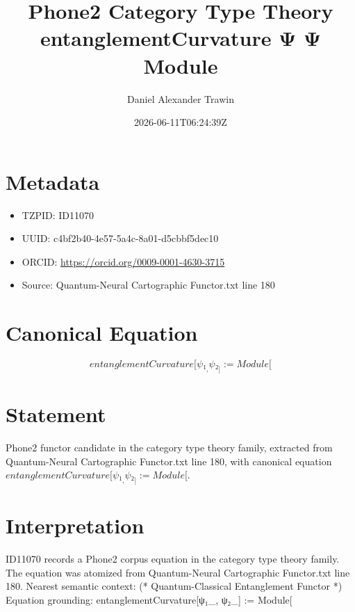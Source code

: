 \documentclass[11pt]{article}
\title{Phone2 Category Type Theory entanglementCurvature Ψ Ψ Module}
\author{Daniel Alexander Trawin}
\date{2026-06-11T06:24:39Z}
\begin{document}
\maketitle
\section*{Metadata}
\begin{itemize}
\item TZPID: ID11070
\item UUID: c4bf2b40-4e57-5a4c-8a01-d5cbbf5dec10
\item ORCID: \url{https://orcid.org/0009-0001-4630-3715}
\item Source: Quantum-Neural Cartographic Functor.txt line 180
\end{itemize}
\section*{Canonical Equation}
\[
entanglementCurvature[ψ₁_, ψ₂_] := Module[
\]
\section*{Statement}
Phone2 functor candidate in the category type theory family, extracted from Quantum-Neural Cartographic Functor.txt line 180, with canonical equation $entanglementCurvature[ψ₁_, ψ₂_] := Module[$.
\section*{Interpretation}
ID11070 records a Phone2 corpus equation in the category type theory family. The equation was atomized from Quantum-Neural Cartographic Functor.txt line 180. Nearest semantic context: (* Quantum-Classical Entanglement Functor *) Equation grounding: entanglementCurvature[ψ₁_, ψ₂_] := Module[
\end{document}
